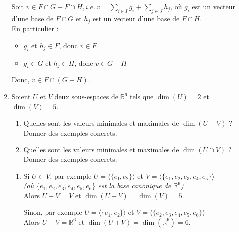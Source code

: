 \documentclass[a4paper, 10pt]{report}
\begin{document}
\begin{enumerate}[label=\arabic*.]
{\begin{minipage}{0.9\textwidth}
				Soit $v \in F \cap G + F \cap H, i.e.\
					v = \sum_{i \in I}g_i + \sum_{j \in J}h_j$,
				où $g_i$ est un vecteur d'une base de $F \cap G$ et
				$h_j$ est un vecteur d'une base de $F \cap H$.\\
				En particulier : \begin{itemize}
					\item $g_i$ et $h_j \in F$, donc $v \in F$
					\item $g_i \in G$ et $h_j \in H$, donc $v \in G + H$
				\end{itemize}
				Donc, $v \in  F \cap (G + H)$.
			\end{minipage}
		}
		\item Soient $U$ et $V$ deux sous-espaces de $\mathbb{R}^6$
		tels que $\dim(U) = 2$ et $\dim(V) = 5$.
		\begin{enumerate}[label=(\alph*)]
			\item Quelles sont les valeurs minimales et maximales de
			$\dim(U + V)$ ? Donner des exemples concrets.
			\item Quelles sont les valeurs minimales et maximales de
			$\dim(U \cap V)$ ? Donner des exemples concrets.
		\end{enumerate}
		
		\colorbox{solution}
		{
			\begin{minipage}{0.9\textwidth}
				\begin{enumerate}[label=(\alph*)]
					\item Si $U \subset V$, par exemple
					$U = \langle\{e_1, e_2\}\rangle$ et
					$V = \langle\{e_1, e_2, e_3, e_4, e_5\}\rangle$\\
					\textit{(où $\{e_1, e_2, e_3, e_4, e_5, e_6\}$
					est la base canonique de $\mathbb{R}^6$)}\\
					Alors $U + V = V$ et $\dim(U + V) = \dim(V) = 5$.
					\vspace{6pt}
					
					Sinon, par exemple $U = \langle\{e_1, e_2\}\rangle$
					et $V = \langle\{e_2, e_3, e_4, e_5, e_6\}\rangle$\\
					Alors $U + V = \mathbb{R}^6$ et $\dim(U + V)
						= \dim(\mathbb{R}^6) = 6$.
					

\end{enumerate}
\end{minipage}}
\end{enumerate}
\end{document}

